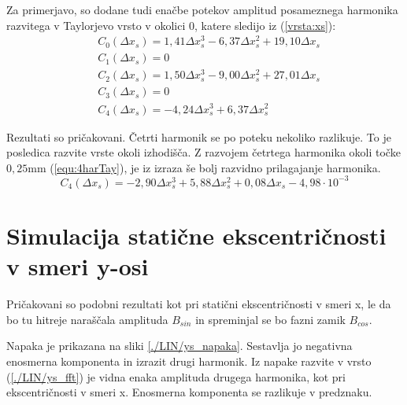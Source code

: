 Za primerjavo, so dodane tudi enačbe potekov amplitud posameznega harmonika razvitega v Taylorjevo vrsto v okolici 0, katere sledijo iz (\ref{vrsta:xs}):
\begin{eqnarray}
&C_0(\Delta x_s) =1,41\Delta x_s^{3}-6,37\Delta x_s^{2}+19,10\Delta x_s \\
&C_1(\Delta x_s) = 0\\
&C_2(\Delta x_s) =1,50\Delta x_s^{3}-9,00\Delta x_s^{2}+27,01\Delta x_s\\
&C_3(\Delta x_s) = 0\\
&C_4(\Delta x_s) =-4,24\Delta x_s^{3}+6,37\Delta x_s^{2}
\end{eqnarray}

Rezultati so pričakovani.
Četrti harmonik se po poteku nekoliko razlikuje. To je posledica razvite vrste okoli izhodišča. Z razvojem četrtega harmonika okoli točke $0,25 \mathrm{ mm}$ (\ref{equ:4harTay}), je iz izraza še bolj razvidno prilagajanje harmonika.
\begin{equation}
\label{equ:4harTay}
C_4(\Delta x_s) =-2,90\Delta x_s^{3}+5,88\Delta x_s^{2}+0,08 \Delta x_s - 4,98 \cdot 10^{-3}
\end{equation}


\section{Simulacija statične ekscentričnosti v smeri y-osi}

Pričakovani so podobni rezultati kot pri statični ekscentričnosti v smeri x, le da bo tu hitreje naraščala amplituda $B_{sin}$ in spreminjal se bo fazni zamik $B_{cos}$.
 

Napaka je prikazana na sliki \ref{./LIN/ys_napaka}. Sestavlja jo negativna enosmerna komponenta in izrazit drugi harmonik. Iz napake razvite v vrsto (\ref{./LIN/ys_fft}) je vidna enaka amplituda drugega harmonika, kot pri ekscentričnosti v smeri x. Enosmerna komponenta se razlikuje v predznaku.
\newpage

